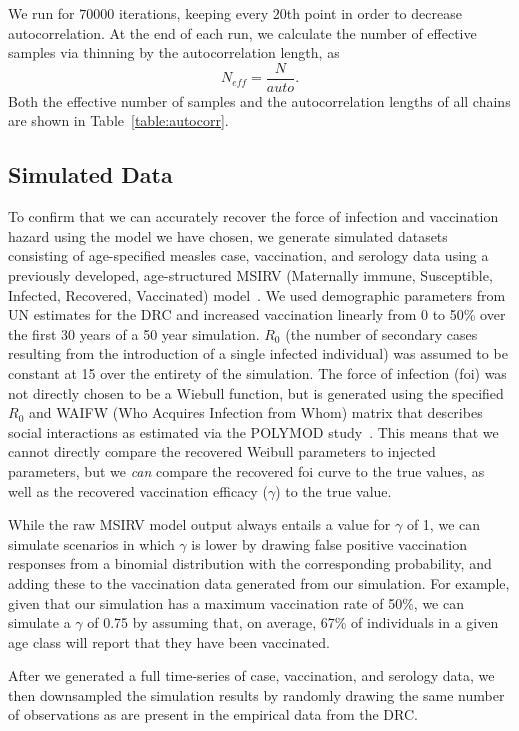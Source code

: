 \documentclass[nofootinbib,aps,pre,twocolumn,superscriptaddress,showkeys,showpacs]{revtex4-1}
\begin{document}
We run for $70000$ iterations, keeping every $20$th point in order to decrease autocorrelation. At the end of each run, we calculate the number of effective samples via thinning by the autocorrelation length, as
\begin{equation}
N_{eff} = \frac{N}{auto}.
\end{equation}
Both the effective number of samples and the autocorrelation lengths of all chains are shown in Table~\ref{table:autocorr}.

\subsection{Simulated Data\label{subsec:SimData}}
To confirm that we can accurately recover the force of infection and vaccination hazard using the model we have chosen, we generate simulated datasets consisting of age-specified measles case, vaccination, and serology data using a previously developed, age-structured MSIRV (Maternally immune, Susceptible, Infected, Recovered, Vaccinated) model~\cite{Metcalf2012}. We used demographic parameters from UN estimates for the DRC and increased vaccination linearly from 0 to 50\% over the first 30 years of a 50 year simulation. $R_{0}$ (the number of secondary cases resulting from the introduction of a single infected individual) was assumed to be constant at 15 over the entirety of the simulation. The force of infection (foi) was not directly chosen to be a Wiebull function, but is generated using the specified $R_0$ and WAIFW (Who Acquires Infection from Whom) matrix that describes social interactions as estimated via the POLYMOD study~\cite{Mossong2008}. This means that we cannot directly compare the recovered Weibull parameters to injected parameters, but we \emph{can} compare the recovered foi curve to the true values, as well as the recovered vaccination efficacy ($\gamma$) to the true value. 

While the raw MSIRV model output always entails a value for $\gamma$ of 1, we can simulate scenarios in which $\gamma$ is lower by drawing false positive vaccination responses from a binomial distribution with the corresponding probability, and adding these to the vaccination data generated from our simulation. For example, given that our simulation has a maximum vaccination rate of 50\%, we can simulate a $\gamma$ of 0.75 by assuming that, on average, 67\% of individuals in a given age class will report that they have been vaccinated.

After we generated a full time-series of case, vaccination, and serology data, we then downsampled the simulation results by randomly drawing the same number of observations as are present in the empirical data from the DRC.
\end{document}
